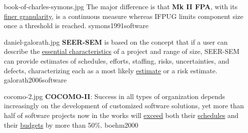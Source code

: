 \documentclass{article}
\begin{document}
\qte
  {book-of-charles-symons.jpg}
  {The major difference is that \textbf{Mk II FPA}, with its \ul{finer granularity}, is a continuous measure whereas IFPUG limits component size once a threshold is reached.}
  {symons1991software}


\qte
  {daniel-galorath.jpg}
  {\textbf{SEER-SEM} is based on the concept that if a user can describe the \ul{essential characteristics} of a project and range of size, SEER-SEM can provide estimates of schedules, efforts, staffing, risks, uncertainties, and defects, characterizing each as a most likely \ul{estimate} or a risk estimate.}
  {galorath2006software}


\qte
  {cocomo-2.jpg}
  {\textbf{COCOMO-II}: Success in all types of organization depends increasingly on the development of customized software solutions, yet more than half of software projects now in the works will \ul{exceed} both their \ul{schedules} and their \ul{budgets} by more than 50\%.}
  {boehm2000}
\end{document}
